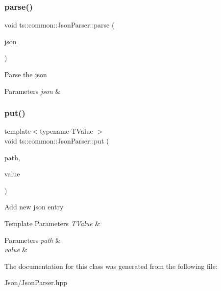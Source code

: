 \subsubsection{\texorpdfstring{parse()}{parse()}}
{\footnotesize\ttfamily void ts\+::common\+::\+Json\+Parser\+::parse (\begin{DoxyParamCaption}\item[{std\+::string const \&}]{json }\end{DoxyParamCaption})}

Parse the json 
\begin{DoxyParams}{Parameters}
{\em json} & \\
\hline
\end{DoxyParams}
\mbox{\label{classts_1_1common_1_1_json_parser_acfb81f9e2bce7073b4f550b4cb99d21e}} 
\subsubsection{\texorpdfstring{put()}{put()}}
{\footnotesize\ttfamily template$<$typename T\+Value $>$ \\
void ts\+::common\+::\+Json\+Parser\+::put (\begin{DoxyParamCaption}\item[{std\+::string const \&}]{path,  }\item[{T\+Value const \&}]{value }\end{DoxyParamCaption})\hspace{0.3cm}{\ttfamily [inline]}}

Add new json entry 
\begin{DoxyTemplParams}{Template Parameters}
{\em T\+Value} & \\
\hline
\end{DoxyTemplParams}

\begin{DoxyParams}{Parameters}
{\em path} & \\
\hline
{\em value} & \\
\hline
\end{DoxyParams}


The documentation for this class was generated from the following file\+:\begin{DoxyCompactItemize}
\item 
Json/Json\+Parser.\+hpp\end{DoxyCompactItemize}
